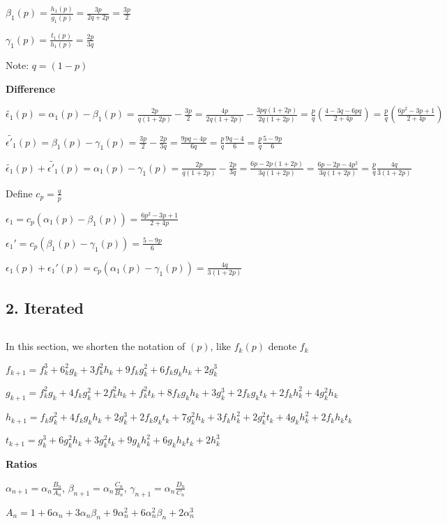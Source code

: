 $\beta_1(p)=\frac{h_1(p)}{g_1(p)}=\frac{3p}{2q+2p}=\frac{3p}{2}$

$\gamma_1(p)=\frac{t_1(p)}{h_1(p)}=\frac{2p}{3q}$

Note: $q = (1-p)$

\textbf{Difference}

$\tilde{\epsilon_1}(p) = \alpha_1(p)-\beta_1(p)=\frac{2p}{q(1+2p)}-\frac{3p}{2} 
= \frac{4p}{2q(1+2p)} - \frac{3pq(1+2p)}{2q(1+2p)} = \frac{p}{q}(\frac{4-3q-6pq}{2+4p})
= \frac{p}{q}(\frac{6p^2-3p+1}{2+4p})$

$\tilde{\epsilon'_1}(p) = \beta_1(p) - \gamma_1(p) = \frac{3p}{2} - \frac{2p}{3q}
= \frac{9pq - 4p}{6q} = \frac{p}{q}\frac{9q-4}{6}=\frac{p}{q}\frac{5-9p}{6}$


$\tilde{\epsilon_1}(p) + \tilde{\epsilon'_1}(p) = \alpha_1(p)-\gamma_1(p) = \frac{2p}{q(1+2p)} - \frac{2p}{3q} 
= \frac{6p - 2p(1+2p)}{3q(1+2p)} = \frac{6p - 2p - 4p^2}{3q(1+2p)} = \frac{p}{q}\frac{4q}{3(1+2p)}$

Define $c_p = \frac{q}{p}$

$\epsilon_1 = c_p(\alpha_1(p) - \beta_1(p)) = \frac{6p^2 - 3p + 1}{2 + 4p}$

$\epsilon_1' = c_p(\beta_1(p) - \gamma_1(p)) = \frac{5-9p}{6}$

$\epsilon_1(p) + \epsilon_1'(p) = c_p(\alpha_1(p) - \gamma_1(p)) = \frac{4q}{3(1+2p)}$

\subsection*{2. Iterated}$ $

In this section, we shorten the notation of $(p)$, like $f_k(p)$ denote $f_k$

$f_{k+1} = f_k^3 + 6_k^2g_k + 3f_k^2h_k + 9f_kg_k^2 + 6f_kg_kh_k + 2g_k^3$

$g_{k+1} = f_k^2g_k + 4f_kg_k^2 + 2f_k^2h_k + f_k^2t_k + 8f_kg_kh_k + 3g_k^3 + 2f_kg_kt_k + 2f_kh_k^2 + 4g_k^2h_k$

$h_{k+1} = f_kg_k^2 + 4f_kg_kh_k + 2g_k^3 + 2f_kg_kt_k + 7g_k^2h_k + 3f_kh_k^2 + 2g_k^2t_k + 4g_kh_k^2 + 2f_kh_kt_k$

$t_{k+1} = g_k^3 + 6g_k^2h_k + 3g_k^2t_k + 9g_kh_k^2 + 6g_kh_kt_k + 2h_k^3$

\textbf{Ratios}

$\alpha_{n+1} = \alpha_n\frac{B_n}{A_n}$, $\beta_{n+1} = \alpha_n\frac{C_n}{B_n}$, $\gamma_{n+1} = \alpha_n\frac{D_n}{C_n}$

$A_n = 1 + 6\alpha_n + 3\alpha_n\beta_n + 9\alpha_n^2 + 6\alpha_n^2\beta_n + 2\alpha_n^3$

